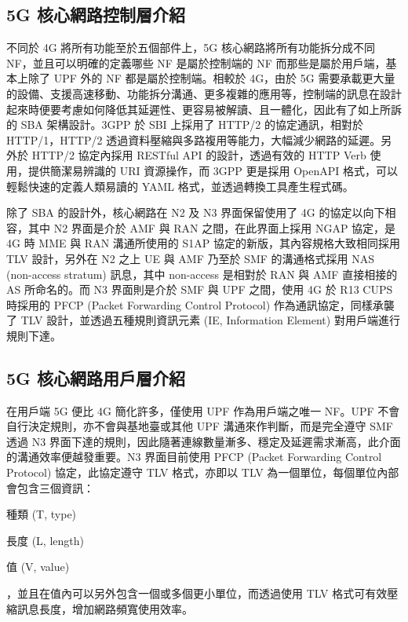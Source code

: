 
\subsection{5G 核心網路控制層介紹}
\label{subsec:5g_cp_intro}

不同於 4G 將所有功能至於五個部件上，5G 核心網路將所有功能拆分成不同 NF，並且可以明確的定義哪些 NF 是屬於控制端的 NF 而那些是屬於用戶端，基本上除了 UPF 外的 NF 都是屬於控制端。相較於 4G，由於 5G 需要承載更大量的設備、支援高速移動、功能拆分溝通、更多複雜的應用等，控制端的訊息在設計起來時便要考慮如何降低其延遲性、更容易被解讀、且一體化，因此有了如上所訴的 SBA 架構設計。3GPP 於 SBI 上採用了 HTTP/2 的協定通訊，相對於 HTTP/1，HTTP/2 透過資料壓縮與多路複用等能力，大幅減少網路的延遲。另外於 HTTP/2 協定內採用 RESTful API 的設計，透過有效的 HTTP Verb 使用，提供簡潔易辨識的 URI 資源操作，而 3GPP 更是採用 OpenAPI 格式，可以輕鬆快速的定義人類易讀的 YAML 格式，並透過轉換工具產生程式碼。

除了 SBA 的設計外，核心網路在 N2 及 N3 界面保留使用了 4G 的協定以向下相容，其中 N2 界面是介於 AMF 與 RAN 之間，在此界面上採用 NGAP 協定，是 4G 時 MME 與 RAN 溝通所使用的 S1AP 協定的新版，其內容規格大致相同採用 TLV 設計，另外在 N2 之上 UE 與 AMF 乃至於 SMF 的溝通格式採用 NAS (non-access stratum) 訊息，其中 non-access 是相對於 RAN 與 AMF 直接相接的 AS 所命名的。而 N3 界面則是介於 SMF 與 UPF 之間，使用 4G 於 R13 CUPS 時採用的 PFCP (Packet Forwarding Control Protocol) 作為通訊協定，同樣承襲了 TLV 設計，並透過五種規則資訊元素 (IE, Information Element) 對用戶端進行規則下達。

\subsection{5G 核心網路用戶層介紹}
\label{subsec:5g_up_intro}

在用戶端 5G 便比 4G 簡化許多，僅使用 UPF 作為用戶端之唯一 NF。UPF 不會自行決定規則，亦不會與基地臺或其他 UPF 溝通來作判斷，而是完全遵守 SMF 透過 N3 界面下達的規則，因此隨著連線數量漸多、穩定及延遲需求漸高，此介面的溝通效率便越發重要。N3 界面目前使用 PFCP (Packet Forwarding Control Protocol) 協定，此協定遵守 TLV 格式，亦即以 TLV 為一個單位，每個單位內部會包含三個資訊：
\begin{enumerate*}
\item 種類 (T, type)
\item 長度 (L, length)
\item 值 (V, value)
\end{enumerate*}
，並且在值內可以另外包含一個或多個更小單位，而透過使用 TLV 格式可有效壓縮訊息長度，增加網路頻寬使用效率。

